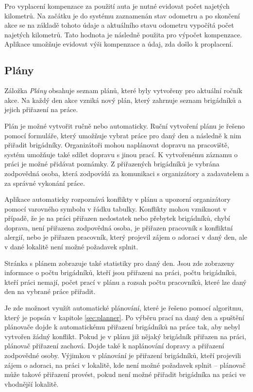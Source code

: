 Pro vyplacení kompenzace za použití auta je nutné evidovat počet najetých kilometrů. Na začátku je do systému zaznamenán stav odometru a po skončení akce
se na základě tohoto údaje a aktuálního stavu odometru vypočítá počet najetých kilometrů. Tato hodnota je následně použita pro výpočet kompenzace. Aplikace 
umožňuje evidovat výši kompenzace a údaj, zda došlo k proplacení.

\subsection{Plány}

Záložka \textit{Plány} obsahuje seznam plánů, které byly vytvořeny pro aktuální ročník akce. Na každý den akce vzniká nový plán, který zahrnuje
seznam brigádníků a jejich přiřazení na práce.

Plán je možné vytvořit ručně nebo automaticky. Ruční vytvoření plánu je řešeno pomocí formuláře, který umožňuje vybrat práce pro daný den a následně 
k nim přiřadit brigádníky. Organizátoři mohou naplánovat dopravu na pracoviště, systém umožňuje také sdílet dopravu s jinou prací. K vytvořenému záznamu
o práci je možné přidávat poznámky. Z přiřazených brigádníků je vybrána zodpovědná osoba, která zodpovídá za komunikaci s organizátory a zadavatelem a za správné vykonání práce.

Aplikace automaticky rozpoznává konflikty v plánu a upozorní organizátory pomocí varovného symbolu v řádku tabulky.
Konflikty mohou vzniknout v případě, že je na práci přiřazen nedostatek nebo přebytek brigádníků, 
chybí doprava, není přiřazena zodpovědná osoba, je přiřazen pracovník s konfliktní alergií, nebo je přiřazen pracovník, který projevil zájem o adoraci v daný den,
ale v dané lokalitě není možné požadavek splnit.

Stránka s plánem zobrazuje také statistiky pro daný den. Jsou zde zobrazeny informace o počtu brigádníků, kteří jsou přiřazeni na práci, počtu brigádníků, kteří
práci nemají, počet prací v plánu a rozsah počtu pracovníků, které lze daný den na vybrané práce přiřadit.

Je zde možnost využít automatické plánování, které je řešeno pomocí algoritmu, který je popsán v kapitole \ref{sec:planner}. Po výběru prací na daný den a spuštění
plánovače dojde k automatickému přiřazení brigádníků na práce tak, aby nebyl vytvořen žádný konflikt. Pokud je v plánu již nějaký brigádník přiřazen na práci, 
plánovač přiřazení zachová. Dojde také k naplánování dopravy a přiřazení zodpovědné osoby. Výjimkou v plánování je přiřazení brigádníků, kteří projevili zájem o adoraci,
na práci v lokalitě, kde není možné požadavek splnit -- plánovač může takové přiřazení provést, pokud není možné přiřadit brigádníka na práci ve vhodnější lokalitě.

